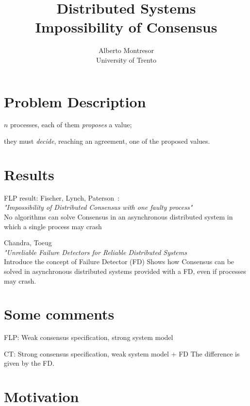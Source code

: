 \documentclass[12pt]{article}
\begin{document}
 

\title{Distributed Systems\\Impossibility of Consensus}
\author{Alberto Montresor\\University of Trento}
\maketitle

\section*{Problem Description}

\BI
\item $n$ processes, each of them {\em proposes} a value;
\item they must {\em decide}, reaching an agreement, one of
  the proposed values.
\EI

\section*{Results}

\BI
\item FLP result: Fischer, Lynch, Paterson~\cite{flp85}: \\
  {\em "Impossibility of Distributed Consensus with one faulty process"} \\
  No algorithms can solve Consensus in an asynchronous distributed
  system in which a single process may crash
  
\item Chandra, Toeug~\cite{ct96,cht96} \\
  {\em "Unreliable Failure Detectors for Reliable Distributed Systems} \\
  Introduce the concept of Failure Detector (FD)
  Shows how Consensus can be solved in asynchronous distributed systems
  provided with a FD, even if processes may crash.
\EI

\section*{Some comments}

\BI
\item FLP: Weak consensus specification, strong system model
\item CT: Strong consensus specification, weak system model + FD
\EI
The difference is given by the FD.

\section*{Motivation}
\end{document}
